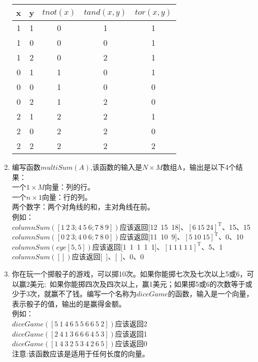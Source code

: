 \documentclass[UTF8]{ctexart}
\begin{document}
\begin{enumerate}
\begin{table}[H]
	\centering
	\begin{longtable}{ccccc}
		\toprule
		\multicolumn{1}{m{2cm}}{\centering x}&\multicolumn{1}{m{2cm}}{\centering y}&\multicolumn{1}{m{2cm}}{\centering $tnot(x)$}&\multicolumn{1}{m{2cm}}{\centering $tand(x,y)$}&\multicolumn{1}{m{2cm}}{\centering $tor(x,y)$}\\
		\midrule
		1&1&0&1&1\\
		1&0&0&0&1\\
		1&2&0&2&1\\
		0&1&1&0&1\\
		0&0&1&0&0\\
		0&2&1&2&0\\
		2&1&2&2&1\\
		2&0&2&2&0\\
		2&2&2&2&2\\
		\bottomrule
	\end{longtable}
\end{table}
\item 编写函数$multiSum(A)$,该函数的输入是$N \times M$数组A，输出是以下4个结果：\\
一个$1\times M$向量：列的行。\\
一个$n\times 1$向量：行的列。\\
两个数字：两个对角线的和，主对角线在前。\\
例如：\\
$columnSum([1\ 2\ 3;4\ 5\ 6;7\ 8\ 9])$应该返回[12\ 15\ 18]、$[6\ 15\ 24]^\mathrm{T}$、15、15\\
$columnSum([0\ 2\ 3;4\ 0\ 6;7\ 8\ 0])$应该返回[11\ 10\ 9]、$[5\ 10\ 15]^\mathrm{T}$、0、10
$columnSum(eye[5,5])$应该返回[1\ 1\ 1\ 1\ 1]、$[1\ 1\ 1\ 1\ 1]^\mathrm{T}$、5、1
$columnSum([])$应该返回[\ ]、[\ ]、0、0\\
\item 你在玩一个掷骰子的游戏，可以掷10次。如果你能掷七次及七次以上5或6，可以赢2美元;\ 如果你能掷四次及四次以上，赢1美元；如果掷5或6的次数等于或少于3次，就赢不了钱。编写一个名称为$diceGame$的函数，输入是一个向量，表示骰子的值，输出的是赢得金额。\\
例如：\\
$diceGame([5\ 1\ 4\ 6\ 5\ 5\ 6\ 6\ 5\ 2])$应该返回2\\
$diceGame([2\ 4\ 1\ 3\ 6\ 6\ 6\ 4\ 5\ 3])$应该返回1\\
$diceGame([1\ 4\ 3\ 2\ 5\ 3\ 4\ 2\ 6\ 5])$应该返回0\\
注意:该函数应该是适用于任何长度的向量。
\end{enumerate}
\end{document}
